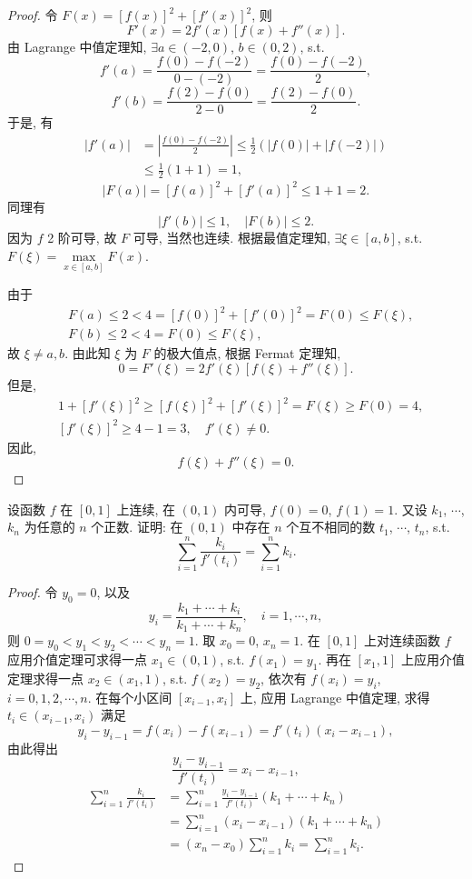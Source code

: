\begin{proof}
令 $F(x)=[f(x)]^{2}+[f'(x)]^{2}$, 则
\[
F'(x)=2f'(x)[f(x)+f''(x)].
\]
由 Lagrange 中值定理知, $\exists a\in(-2,0)$, $b\in(0,2)$, s.t.
\[
f'(a)=\frac{f(0)-f(-2)}{0-(-2)}=\frac{f(0)-f(-2)}{2},
\]
\[
f'(b)=\frac{f(2)-f(0)}{2-0}=\frac{f(2)-f(0)}{2}.
\]
于是, 有
\[
\begin{aligned}
|f'(a)|&=\left|\frac{f(0)-f(-2)}{2}\right|\leqslant\frac{1}{2}(|f(0)|+|f(-2)|)\\
&\leqslant\frac{1}{2}(1+1)=1,
\end{aligned}
\]
\[
|F(a)|=[f(a)]^{2}+[f'(a)]^{2}\leqslant1+1=2.
\]
同理有
\[
|f'(b)|\leqslant1,\quad|F(b)|\leqslant2.
\]
因为 $f$ 2 阶可导, 故 $F$ 可导, 当然也连续. 根据最值定理知, $\exists\xi\in[a,b]$, s.t. $F(\xi)=\max\limits_{x\in[a,b]}F(x)$.

由于
\[
\begin{aligned}
&F(a)\leqslant2<4=[f(0)]^{2}+[f'(0)]^{2}=F(0)\leqslant F(\xi),\\
&F(b)\leqslant2<4=F(0)\leqslant F(\xi),
\end{aligned}
\]
故 $\xi\neq a,b$. 由此知 $\xi$ 为 $F$ 的极大值点, 根据 Fermat 定理知,
\[
0=F'(\xi)=2f'(\xi)[f(\xi)+f''(\xi)].
\]
但是,
\[
\begin{aligned}
&1+[f'(\xi)]^{2}\geqslant[f(\xi)]^{2}+[f'(\xi)]^{2}=F(\xi)\geqslant F(0)=4,\\
&[f'(\xi)]^{2}\geqslant4-1=3,\quad f'(\xi)\neq0.
\end{aligned}
\]
因此,
\[
f(\xi)+f''(\xi)=0.
\]
\end{proof}

\begin{example}\label{ex:3.3.9}
设函数 $f$ 在 $[0,1]$ 上连续, 在 $(0,1)$ 内可导, $f(0)=0$, $f(1)=1$. 又设 $k_1$, $\cdots$, $k_n$ 为任意的 $n$ 个正数. 证明: 在 $(0,1)$ 中存在 $n$ 个互不相同的数 $t_1$, $\cdots$, $t_n$, s.t.
\[
\sum_{i=1}^{n}\frac{k_i}{f'(t_i)}=\sum_{i=1}^{n}k_i.
\]
\end{example}

\begin{proof}
令 $y_0=0$, 以及
\[
y_i=\frac{k_1+\cdots+k_i}{k_1+\cdots+k_n},\quad i=1,\cdots,n,
\]
则 $0=y_0<y_1<y_2<\cdots<y_n=1$. 取 $x_0=0$, $x_n=1$. 在 $[0,1]$ 上对连续函数 $f$ 应用介值定理可求得一点 $x_1\in(0,1)$, s.t. $f(x_1)=y_1$. 再在 $[x_1,1]$ 上应用介值定理求得一点 $x_2\in(x_1,1)$, s.t. $f(x_2)=y_2$, 依次有 $f(x_i)=y_i$, $i=0,1,2,\cdots,n$. 在每个小区间 $[x_{i-1},x_i]$ 上, 应用 Lagrange 中值定理, 求得 $t_i\in(x_{i-1},x_i)$ 满足
\[
y_i-y_{i-1}=f(x_i)-f(x_{i-1})=f'(t_i)(x_i-x_{i-1}),
\]
由此得出
\[
\frac{y_i-y_{i-1}}{f'(t_i)}=x_i-x_{i-1},
\]
\[
\begin{aligned}
\sum_{i=1}^{n}\frac{k_i}{f'(t_i)}&=\sum_{i=1}^{n}\frac{y_i-y_{i-1}}{f'(t_i)}(k_1+\cdots+k_n)\\
&=\sum_{i=1}^{n}(x_i-x_{i-1})(k_1+\cdots+k_n)\\
&=(x_n-x_0)\sum_{i=1}^{n}k_i=\sum_{i=1}^{n}k_i.
\end{aligned}
\]
\end{proof}

